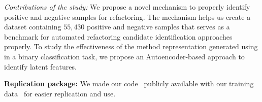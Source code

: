 \textit{Contributions of the study:}
    We propose a novel mechanism to properly identify positive and negative samples for \exm{} refactoring.
    The mechanism helps us create a dataset containing $55,430$ positive and negative samples that serves as a benchmark for automated refactoring candidate identification approaches properly.
  To study the effectiveness of the method representation generated using \GCB{} in a binary classification task, we propose an Autoencoder-based approach to identify latent features.


\textbf{Replication package:} We made our code~\cite{ExtractMethodIdentificationRepo} publicly available with our training data~\cite{indranil_palit_2023_8122619} for easier replication and use.


 


 



